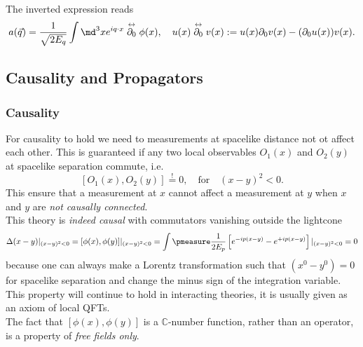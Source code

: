 The inverted expression reads 
\begin{equation}
	a(\vec{q}) = \frac{1}{\sqrt{2 E_q}} \int \md^3xe^{i q\cdot x} \stackrel{\leftrightarrow}{\partial_0} \phi(x), \quad u(x)\stackrel{\leftrightarrow}{\partial_0} v(x) := u(x) \partial_0 v(x) - (\partial_0 u(x)) v(x).
\end{equation}






\subsection{Causality and Propagators}
\subsubsection{Causality}
For causality to hold we need to measurements at spacelike distance not ot affect each other. This is guaranteed if any two local observables $O_1(x)$ and $O_2(y)$ at spacelike separation commute, i.e. 
\begin{equation}
	\left[O_1(x),O_2(y)\right] \stackrel{!}{=} 0, \quad \mathrm{for} \quad (x-y)^2 < 0.
\end{equation}
This ensure that a measurement at $x$ cannot affect a measurement at $y$ when $x$ and $y$ are \emph{not causally connected}.\\
This theory is \emph{indeed causal} with commutators vanishing outside the lightcone 
\begin{equation}
	\Delta(x-y)|_{(x-y)^2<0} = [\phi(x),\phi(y)] |_{(x-y)^2<0} = \int \pmeasure \frac{1}{2 E_p} \left[e^{-ip(x-y)} - e^{+i p(x-y)} \right]|_{(x-y)^2<0}=0
\end{equation}
because one can always make a Lorentz transformation such that $(x^0-y^0)=0$ for spacelike separation and change the minus sign of the integration variable.
This property will continue to hold in interacting theories, it is usually given as an axiom of local QFTs.\\
The fact that $[\phi(x),\phi(y)]$ is a $\mathbb{C}$-number function, rather than an operator, is a property of \emph{free fields only}.
